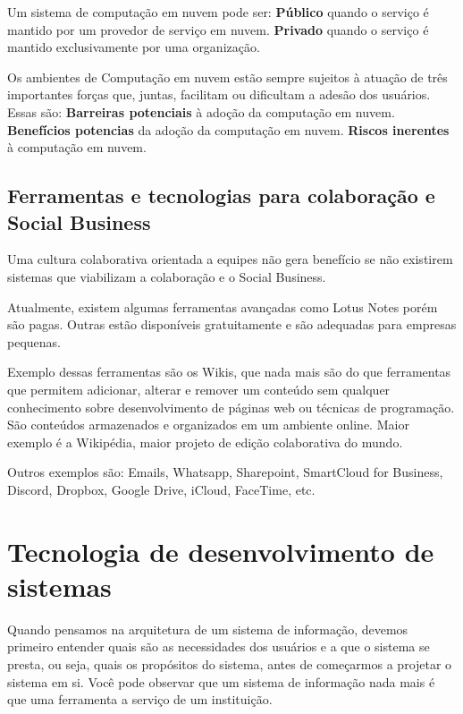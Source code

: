 \documentclass[12pt]{article}
\begin{document}
Um sistema de computação em nuvem pode ser: \textbf{Público} quando o serviço 
é mantido por um provedor de serviço em nuvem. \textbf{Privado} quando o serviço 
é mantido exclusivamente por uma organização.

Os ambientes de Computação em nuvem estão sempre sujeitos à atuação de três
importantes forças que, juntas, facilitam ou dificultam a adesão dos usuários. Essas
são: \textbf{Barreiras potenciais} à adoção da computação em nuvem. 
\textbf{Benefícios potencias} da adoção da computação em nuvem. 
\textbf{Riscos inerentes} à computação em nuvem.

\subsection{Ferramentas e tecnologias para colaboração e Social Business}
Uma cultura colaborativa orientada a equipes não gera benefício se não
existirem sistemas que viabilizam a colaboração e o Social Business.

Atualmente, existem algumas ferramentas avançadas como Lotus Notes
porém são pagas. Outras estão disponíveis gratuitamente e são adequadas
para empresas pequenas.

Exemplo dessas ferramentas são os Wikis, que nada mais são do que ferramentas
que permitem adicionar, alterar e remover um conteúdo sem qualquer conhecimento
sobre desenvolvimento de páginas web ou técnicas de programação. 
São conteúdos armazenados e organizados em um ambiente online. Maior exemplo
é a Wikipédia, maior projeto de edição colaborativa do mundo.

Outros exemplos são: Emails, Whatsapp, Sharepoint, SmartCloud for Business, 
Discord, Dropbox, Google Drive, iCloud, FaceTime, etc.

\indent
\section{Tecnologia de desenvolvimento de sistemas}
Quando pensamos na arquitetura de um sistema de informação, devemos primeiro
entender quais são as necessidades dos usuários e a que o sistema se presta, ou seja,
quais os propósitos do sistema, antes de começarmos a projetar o sistema em si.
Você pode observar que um sistema de informação nada mais é que uma ferramenta
a serviço de um instituição.
\end{document}
